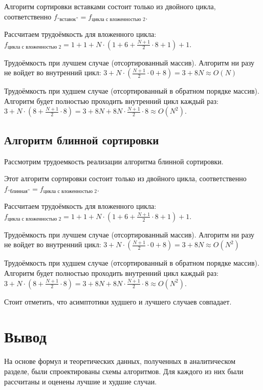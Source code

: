 Алгоритм сортировки вставками состоит только из двойного цикла, соответственно
$f_{\text{``вставок''}} = f_{\text{цикла с вложенностью 2}}$.

Рассчитаем трудоёмкость для вложенного цикла:
$f_{\text{цикла с вложенностью 2}} = 1 + 1 + N \cdot 
(1 + 6 + \frac{N + 1}{2} \cdot 8 + 1) + 1$.

Трудоёмкость при лучшем случае (отсортированный массив). Алгоритм ни разу не войдет 
во внутренний цикл:
$3 + N \cdot 
(\frac{N + 1}{2} \cdot 0 + 8) = 3 + 8N \approx O(N)$

Трудоёмкость при худшем случае (отсортированный в обратном порядке массив).
Алгоритм будет полностью проходить внутренний цикл каждый раз:
$3 + N \cdot 
(8 + \frac{N + 1}{2} \cdot 8) = 3 + 8N + 8N \cdot \frac{N + 1}{2} \cdot 8 \approx O(N^2)$.


\subsection{Алгоритм блинной сортировки}

Рассмотрим трудоемкость реализации алгоритма блинной сортировки.

Этот алгоритм сортировки состоит только из двойного цикла, соответственно
$f_{\text{``блинная''}} = f_{\text{цикла с вложенностью 2}}$.

Рассчитаем трудоёмкость для вложенного цикла:
$f_{\text{цикла с вложенностью 2}} = 1 + 1 + N \cdot 
(1 + 6 + \frac{N + 1}{2} \cdot 8 + 1) + 1$.

Трудоёмкость при лучшем случае (отсортированный массив). Алгоритм ни разу не войдет 
во внутренний цикл:
$3 + N \cdot 
(\frac{N + 1}{2} \cdot 0 + 8) = 3 + 8N \approx O(N^2)$

Трудоёмкость при худшем случае (отсортированный в обратном порядке массив).
Алгоритм будет полностью проходить внутренний цикл каждый раз:
$3 + N \cdot 
(8 + \frac{N + 1}{2} \cdot 8) = 3 + 8N + 8N \cdot \frac{N + 1}{2} \cdot 8 \approx O(N^2)$.

Стоит отметить, что асимптотики худшего и лучшего случаев совпадает.

\section*{Вывод}

На основе формул и теоретических данных, полученных в аналитическом разделе, были спроектированы схемы алгоритмов.
Для каждого из них были рассчитаны и оценены лучшие и худшие случаи.
